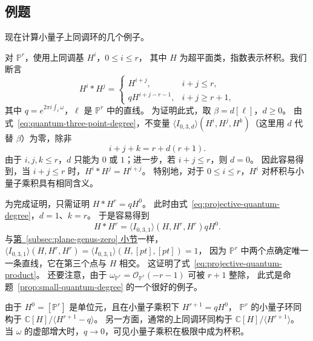 \subsection{例题}\label{subsec:small-quantum-examples}
\label{subsec:a-model-correlation}
现在计算小量子上同调环的几个例子。
\begin{example}\label{ex:projective-quantum-ring}
对 $\mathbb P^r$，使用上同调基 $H^i$，$0\leq i\leq r$，
其中 $H$ 为超平面类，指数表示杯积。我们断言
\begin{equation}\label{eq:projective-quantum-product}
H^i*H^j=\begin{cases}
H^{i+j},&i+j\leq r,\\
qH^{i+j-r-1},&i+j\geq r+1,
\end{cases}
\end{equation}
其中 $q=e^{2\pi i\int_\ell\omega}$，$\ell$ 是 $\mathbb P^r$ 中的直线。
为证明此式，取 $\beta=d[\ell]$，$d\geq0$。
由式~\eqref{eq:quantum-three-point-degree}，不变量
$\langle I_{0,3,d}\rangle(H^i,H^j,H^k)$（这里用 $d$ 代替 $\beta$）为零，除非
\begin{equation}\label{eq:projective-quantum-degree}
i+j+k=r+d(r+1).
\end{equation}
由于 $i,j,k\leq r$，$d$ 只能为 $0$ 或 $1$；进一步，若 $i+j\leq r$，则 $d=0$。
因此容易得到，当 $i+j\leq r$ 时，$H^i*H^j=H^{i+j}$。
特别地，对于 $0\leq i\leq r$，$H^i$ 对杯积与小量子乘积具有相同含义。

为完成证明，只需证明 $H*H^r=qH^0$。
此时由式~\eqref{eq:projective-quantum-degree}，$d=1$、$k=r$。
于是容易得到
\[
H*H^r=\langle I_{0,3,1}\rangle(H,H^r,H^r)qH^0.
\]
与\hyperref[subsec:plane-genus-zero]{第~\ref*{subsec:plane-genus-zero} 小节}一样，
$\langle I_{0,3,1}\rangle(H,H^r,H^r)=\langle I_{0,3,1}\rangle(H,[pt],[pt])=1$，
因为 $\mathbb P^r$ 中两个点确定唯一一条直线，它在第三个点与 $H$ 相交。
这证明了式~\eqref{eq:projective-quantum-product}。
还要注意，由于 $\omega_{\mathbb P^r}=\mathcal O_{\mathbb P^r}(-r-1)$ 可被 $r+1$ 整除，
此式是命题~\ref{prop:small-quantum-degree} 的一个很好的例子。

由于 $H^0=[\mathbb P^r]$ 是单位元，且在小量子乘积下 $H^{r+1}=qH^0$，
$\mathbb P^r$ 的小量子环同构于
$\mathbb C[H]/\langle H^{r+1}-q\rangle$。
另一方面，通常的上同调环同构于 $\mathbb C[H]/\langle H^{r+1}\rangle$。
当 $\omega$ 的虚部增大时，$q\to0$，可见小量子乘积在极限中成为杯积。
\end{example}

